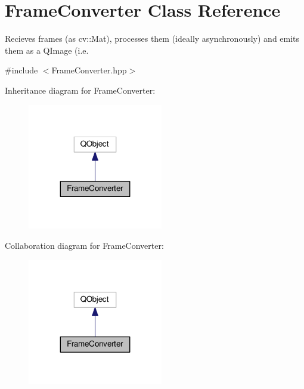 \hypertarget{classFrameConverter}{}\section{Frame\+Converter Class Reference}
\label{classFrameConverter}


Recieves frames (as cv\+::\+Mat), processes them (ideally asynchronously) and emits them as a Q\+Image (i.\+e.  




{\ttfamily \#include $<$Frame\+Converter.\+hpp$>$}



Inheritance diagram for Frame\+Converter\+:\nopagebreak
\begin{figure}[H]
\begin{center}
\leavevmode
\includegraphics[width=167pt]{classFrameConverter__inherit__graph}
\end{center}
\end{figure}


Collaboration diagram for Frame\+Converter\+:\nopagebreak
\begin{figure}[H]
\begin{center}
\leavevmode
\includegraphics[width=167pt]{classFrameConverter__coll__graph}
\end{center}
\end{figure}
